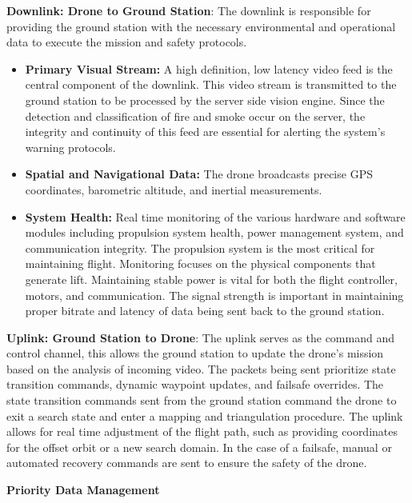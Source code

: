 \documentclass[journal, onecolumn]{IEEEtran}
\begin{document}
\textbf{Downlink: Drone to Ground Station}: The downlink is responsible for providing the ground station with the necessary environmental and operational data to execute the mission and safety protocols.

\begin{itemize}
  \item \textbf{Primary Visual Stream:} A high definition, low latency video feed is the central component of the downlink. This video stream is transmitted to the ground station to be processed by the server side vision engine. Since the detection and classification of fire and smoke occur on the server, the integrity and continuity of this feed are essential for alerting the system’s warning protocols.
  \item \textbf{Spatial and Navigational Data:} The drone broadcasts precise GPS coordinates, barometric altitude, and inertial measurements. 
  \item \textbf{System Health:} Real time monitoring of the various hardware and software modules including propulsion system health, power management system, and communication integrity. The propulsion system is the most critical for maintaining flight. Monitoring focuses on the physical components that generate lift. Maintaining stable power is vital for both the flight controller, motors, and communication. The signal strength is important in maintaining proper bitrate and latency of data being sent back to the ground station.
  
\end{itemize}
\vspace{0.5em}

\textbf{Uplink: Ground Station to Drone}: The uplink serves as the command and control channel, this allows the ground station to update the drone’s mission based on the analysis of incoming video. The packets being sent prioritize state transition commands, dynamic waypoint updates, and failsafe overrides. The state transition commands sent from the ground station command the drone to exit a search state and enter a mapping and triangulation procedure. The uplink allows for real time adjustment of the flight path, such as providing coordinates for the offset orbit or a new search domain. In the case of a failsafe, manual or automated recovery commands are sent to ensure the safety of the drone.
\vspace{0.5em}

\textbf{Priority Data Management}
\end{document}
